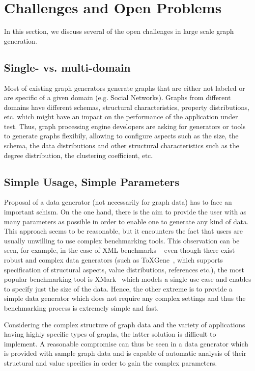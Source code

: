 \section{Challenges and Open Problems}
\label{sec:challenges}

In this section, we discuss several of the open challenges in large scale graph
generation.

\subsection{Single- vs. multi-domain}

Most of existing graph generators generate graphs that are either not labeled or
are specific of a given domain (e.g.  Social Networks). Graphs from different
domains have different schemas, structural characteristics, property
distributions, etc. which might have an impact on the performance of the
application under test. Thus, graph processing engine developers are asking for
generators or tools to generate graphs flexibily, allowing to configure aspects
such as the size, the schema, the data distributions and other structural
characteristics such as the degree distribution, the clustering coefficient,
etc.


\subsection{Simple Usage, Simple Parameters}
Proposal of a data generator (not necessarily for graph data) has to face an
important schism. On the one hand, there is the aim to provide the user with as
many parameters as possible in order to enable one to generate any kind of data.
This approach seems to be reasonable, but it encounters the fact that users are
usually unwilling to use complex benchmarking tools. This observation can be
seen, for example, in the case of XML benchmarks -- even though there exist
robust and complex data generators (such as
ToXGene~\cite{conf/webdb/BarbosaMKL02}, which supports specification of
structural aspects, value distributions, references etc.), the most popular
benchmarking tool is XMark~\cite{Schmidt:2002:XBX:1287369.1287455} which models
a single use case and enables to specify just the size of the data. Hence, the
other extreme is to provide a simple data generator which does not require any
complex settings and thus the benchmarking process is extremely simple and fast.

Considering the complex structure of graph data and the variety of applications
having highly specific types of graphs, the latter solution is difficult to
implement. A reasonable compromise can thus be seen in a data generator which is
provided with sample graph data and is capable of automatic analysis of their
structural and value specifics in order to gain the complex parameters.

